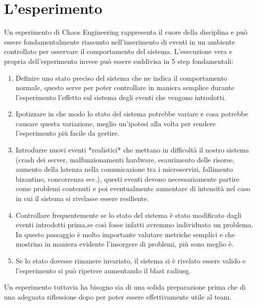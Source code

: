 \section{L'esperimento}

Un esperimento di Chaos Engineering rappresenta il cuore della disciplina e può essere fondamentalmente riassunto nell'inserimento di eventi in un ambiente controllato per osservare il comportamento del sistema.
L'esecuzione vera e propria dell'esperimento invece può essere suddivisa in 5 step fondamentali:
\begin{enumerate}
    \item Definire uno stato preciso del sistema che ne indica il comportamento normale, questo serve per poter controllare in maniera semplice durante l'esperimento l'effetto sul sistema degli eventi che vengono introdotti.
    \item Ipotizzare in che modo lo stato del sistema potrebbe variare e cosa potrebbe causare questa variazione, meglio un'ipotesi alla volta per rendere l'esperimento più facile da gestire.
    \item Introdurre nuovi eventi *realistici* che mettano in difficoltà il nostro sistema (crash dei server, malfunzionamenti hardware, esaurimento delle risorse, aumento della latenza nella comunicazione tra i microservizi, fallimento bizantino, concorrenza ecc.), questi eventi devono necessariamente partire come problemi contenuti e poi eventualmente aumentare di intensità nel caso in cui il sistema si rivelasse essere resiliente.
    \item Controllare frequentemente se lo stato del sistema è stato modificato dagli eventi introdotti prima,se così fosse infatti avremmo individuato un problema. In questo passaggio è molto importante valutare metriche semplici e che mostrino in maniera evidente l'insorgere di problemi, più sono meglio è.
    \item Se lo stato dovesse rimanere invariato, il sistema si è rivelato essere valido e l'esperimento si può ripetere aumentando il \gls{blast radiusg}.
\end{enumerate}
Un esperimento tuttavia ha bisogno sia di una solida preparazione prima che di una adeguata riflessione dopo per poter essere effettivamente utile al team.

